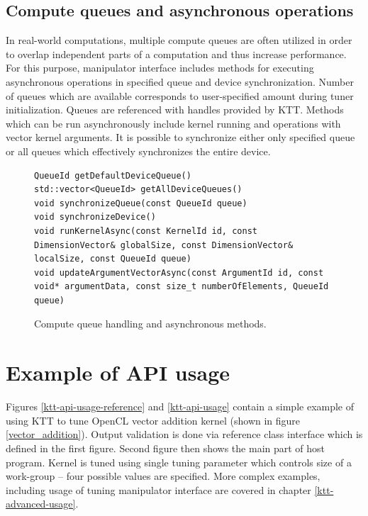 \documentclass
[
    digital, %
    oneside, %
    table, %
    nolof, %
    nolot, %
    nocover %
]{fithesis3}
\begin{document}
\subsection{Compute queues and asynchronous operations}
In real-world computations, multiple compute queues are often utilized in order to overlap independent parts of a computation and thus increase
performance. For this purpose, manipulator interface includes methods for executing asynchronous operations in specified queue and device synchronization.
Number of queues which are available corresponds to user-specified amount during tuner initialization. Queues are referenced with handles provided by KTT.
Methods which can be run asynchronously include kernel running and operations with vector kernel arguments. It is possible to synchronize either only
specified queue or all queues which effectively synchronizes the entire device.

\begin{figure}
\begin{adjustwidth}{-1cm}{-1cm}
\begin{lstlisting}
QueueId getDefaultDeviceQueue()
std::vector<QueueId> getAllDeviceQueues()
void synchronizeQueue(const QueueId queue)
void synchronizeDevice()
void runKernelAsync(const KernelId id, const DimensionVector& globalSize, const DimensionVector& localSize, const QueueId queue)
void updateArgumentVectorAsync(const ArgumentId id, const void* argumentData, const size_t numberOfElements, QueueId queue)
\end{lstlisting}
\caption{Compute queue handling and asynchronous methods.}
\label{ktt-manipulator-asynchronous-methods}
\end{adjustwidth}
\end{figure}

\section{Example of API usage}
Figures \ref{ktt-api-usage-reference} and \ref{ktt-api-usage} contain a simple example of using KTT to tune OpenCL vector addition kernel (shown in
figure \ref{vector_addition}). Output validation is done via reference class interface which is defined in the first figure. Second figure then shows
the main part of host program. Kernel is tuned using single tuning parameter which controls size of a work-group -- four possible values are specified.
More complex examples, including usage of tuning manipulator interface are covered in chapter \ref{ktt-advanced-usage}.
\end{document}
